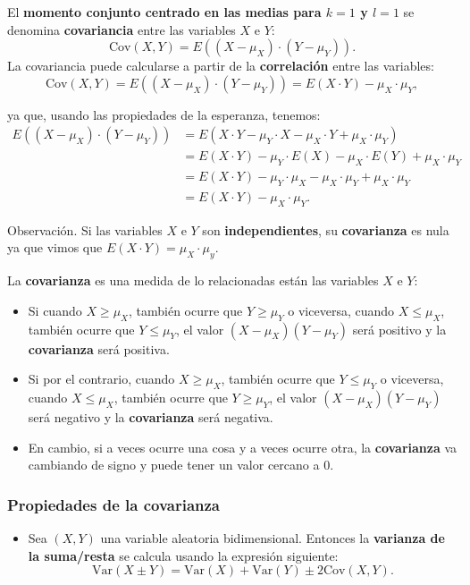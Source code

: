 \documentclass[]{book}
\providecommand{\tightlist}{%
  \setlength{\itemsep}{0pt}\setlength{\parskip}{0pt}}
\begin{document}
El \textbf{momento conjunto centrado en las medias para \(k=1\) y \(l=1\)} se denomina \textbf{covariancia} entre las variables \(X\) e \(Y\):
\[
\mathrm{Cov}(X,Y)=E((X-\mu_X)\cdot (Y-\mu_Y)).
\]
La covariancia puede calcularse a partir de la \textbf{correlación} entre las variables:
\[
\mathrm{Cov}(X,Y)=E((X-\mu_X) \cdot (Y-\mu_Y))=E(X\cdot Y)-\mu_X\cdot \mu_Y,
\]

ya que, usando las propiedades de la esperanza, tenemos:
\[
\begin{array}{rl}
E((X-\mu_X)\cdot (Y-\mu_Y)) & =E(X\cdot Y-\mu_Y \cdot X-\mu_X \cdot Y+\mu_X\cdot \mu_Y)\\ & =E(X\cdot Y)-\mu_Y\cdot E(X)-\mu_X \cdot E(Y)+\mu_X\cdot \mu_Y \\ &  = E(X\cdot Y)-\mu_Y\cdot \mu_X-\mu_X \cdot \mu_Y+\mu_X\cdot \mu_Y \\ & = E(X\cdot Y)-\mu_X\cdot \mu_Y.
\end{array}
\]

Observación.
Si las variables \(X\) e \(Y\) son \textbf{independientes}, su \textbf{covarianza} es nula ya que vimos que \(E(X\cdot Y)=\mu_X\cdot \mu_y\).

La \textbf{covarianza} es una medida de lo relacionadas están las variables \(X\) e \(Y\):

\begin{itemize}
\item
  Si cuando \(X\geq \mu_X\), también ocurre que \(Y\geq \mu_Y\) o viceversa, cuando \(X\leq \mu_X\), también ocurre que \(Y\leq \mu_Y\), el valor \((X-\mu_X)(Y-\mu_Y)\) será positivo y la \textbf{covarianza} será positiva.
\item
  Si por el contrario, cuando \(X\geq \mu_X\), también ocurre que \(Y\leq \mu_Y\) o viceversa, cuando \(X\leq \mu_X\), también ocurre que \(Y\geq \mu_Y\), el valor \((X-\mu_X)(Y-\mu_Y)\) será negativo y la \textbf{covarianza} será negativa.
\item
  En cambio, si a veces ocurre una cosa y a veces ocurre otra, la \textbf{covarianza} va cambiando de signo y puede tener un valor cercano a 0.
\end{itemize}

\hypertarget{propiedades-de-la-covarianza}{%
\subsubsection{Propiedades de la covarianza}\label{propiedades-de-la-covarianza}}

\begin{itemize}
\tightlist
\item
  Sea \((X,Y)\) una variable aleatoria bidimensional. Entonces la \textbf{varianza de la suma/resta} se calcula usando la expresión siguiente:
  \[
  \mathrm{Var}(X\pm Y)=\mathrm{Var}(X)+\mathrm{Var}(Y)\pm 2 \mathrm{Cov}(X,Y).
  \]
\end{itemize}
\end{document}
